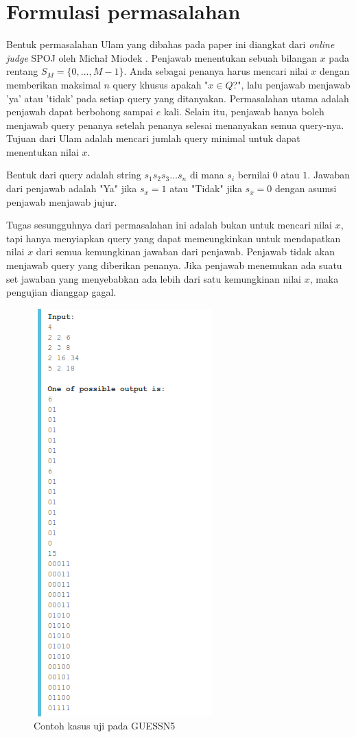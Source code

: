 \section{Formulasi permasalahan}

Bentuk permasalahan Ulam yang dibahas pada paper ini diangkat dari \textit{online judge} SPOJ oleh Micha\l{} Miodek \cite{guessn5}. Penjawab menentukan sebuah bilangan $x$ pada rentang $S_M=\{0,\ldots,M-1\}$. Anda sebagai penanya harus mencari nilai $x$ dengan memberikan maksimal $n$ query khusus apakah "$x \in Q$?", lalu penjawab menjawab 'ya' atau 'tidak' pada setiap query yang ditanyakan. Permasalahan utama adalah penjawab dapat berbohong sampai $e$ kali. Selain itu, penjawab hanya boleh menjawab query penanya setelah penanya selesai menanyakan semua query-nya. Tujuan dari Ulam adalah mencari jumlah query minimal untuk dapat menentukan nilai $x$.

Bentuk dari query adalah string $s_1s_2s_3\ldots s_n$ di mana $s_i$ bernilai $0$ atau $1$. Jawaban dari penjawab adalah "Ya" jika $s_x=1$ atau "Tidak" jika $s_x=0$ dengan asumsi penjawab menjawab jujur.

Tugas sesungguhnya dari permasalahan ini adalah bukan untuk mencari nilai $x$, tapi hanya menyiapkan query yang dapat memeungkinkan untuk mendapatkan nilai $x$ dari semua kemungkinan jawaban dari penjawab. Penjawab tidak akan menjawab query yang diberikan penanya. Jika penjawab menemukan ada suatu set jawaban yang menyebabkan ada lebih dari satu kemungkinan nilai $x$, maka pengujian dianggap gagal.

\begin{figure}
\centering
\includegraphics[scale=0.43]{../img/example.png}
\caption{Contoh kasus uji pada GUESSN5}
\label{fig:guessn5_test_case}
\end{figure}

